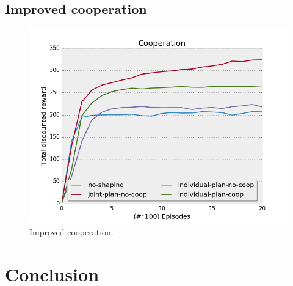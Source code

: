 \documentclass[letterpaper]{article}
\begin{document}
\subsection{Improved cooperation}

\begin{figure}[h!]
  \includegraphics[width=\linewidth]{img/coop.png}
  \caption{Improved cooperation.}
  \label{fig:results3}
\end{figure}

\section{Conclusion}




\footnotesize


\end{document}
